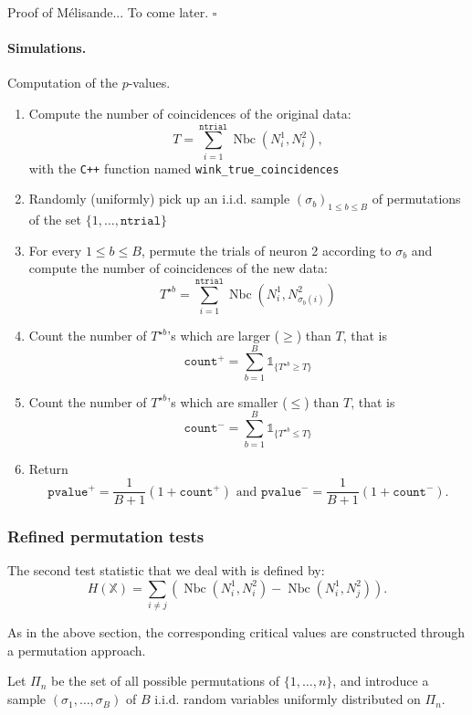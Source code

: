\documentclass[a4paper,oneside,10pt]{article}
\newenvironment{dem}{\noindent{\bf Proof :}}{\hfill             %
  $\square$\par \noindent}
\newcommand{\pa}[1]{\ensuremath{\left( #1 \right)}}
\newcommand{\Nbc}{\operatorname{Nbc}}
\newcommand{\X}{\ensuremath{\mathds{X}}}
\newcommand{\1}[1]{\ensuremath{\mathds{1}_{\{ #1 \}}}}  %
\begin{document}
\begin{dem}
Proof of Mélisande... To come later.
\end{dem}


\paragraph{Simulations.}
Computation of the $p$-values.
\begin{enumerate}
\item Compute the number of coincidences of the original data: 
$$T=\sum_{i=1}^{\texttt{ntrial}} \Nbc(N^1_i,N^2_{i}),$$
with the \texttt{C++} function named \texttt{wink\_true\_coincidences}
\item Randomly (uniformly) pick up an i.i.d. sample $\pa{\sigma_b}_{1\leq b\leq B}$ of permutations of the set $\{1,\ldots,\texttt{ntrial}\}$
\item For every $1\leq b\leq B$, permute the trials of neuron 2 according to $\sigma_b$ and compute the number of coincidences of the new data:
$$T^{\star b}=\sum_{i=1}^{\texttt{ntrial}} \Nbc(N^1_i,N^2_{\sigma_b(i)})$$
\item Count the number of $T^{\star b}$'s which are larger ($\geq$) than $T$, that is
$$\texttt{count}^+=\sum_{b=1}^B \1{T^{\star b}\geq T}$$
\item Count the number of $T^{\star b}$'s which are smaller ($\leq$) than $T$, that is
$$\texttt{count}^-=\sum_{b=1}^B \1{T^{\star b}\leq T}$$
\item Return $$\texttt{pvalue}^+=\frac{1}{B+1}\pa{1+\texttt{count}^+}\textrm{ and }\texttt{pvalue}^-=\frac{1}{B+1}\pa{1+\texttt{count}^-}.$$
\end{enumerate}

\subsubsection{Refined permutation tests}

The second test statistic that we deal with is defined by:
\begin{equation}\label{defstat2}
H(\X)=\sum_{i\neq j} \left(\Nbc(N_i^1,N_i^2)-\Nbc(N_i^1,N_j^2)\right).
\end{equation}

As in the above section, the corresponding critical values are constructed through a permutation approach.

Let $\Pi_n$ be the set of all possible permutations of $\{1,\ldots,n\}$, and  introduce  a sample  $\pa{\sigma_1,\ldots,\sigma_B}$ of $B$  i.i.d. random variables uniformly distributed on $\Pi_n$.
\end{document}
